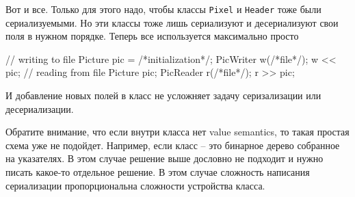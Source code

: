 Вот и все.
Только для этого надо, чтобы классы \verb"Pixel" и \verb"Header" тоже были сериализуемыми.
Но эти классы тоже лишь сериализуют и десериализуют свои поля в нужном порядке.
Теперь все используется максимально просто
\begin{cppcode}
// writing to file
Picture pic = /*initialization*/;
PicWriter w(/*file*/);
w << pic;
// reading from file
Picture pic;
PicReader r(/*file*/);
r >> pic;
\end{cppcode}
И добавление новых полей в класс не усложняет задачу серизализации или десериализации.

Обратите внимание, что если внутри класса нет value semantics, то такая простая схема уже не подойдет.
Например, если класс -- это бинарное дерево собранное на указателях.
В этом случае решение выше дословно не подходит и нужно писать какое-то отдельное решение.
В этом случае сложность написания сериализации пропорциональна сложности устройства класса.

